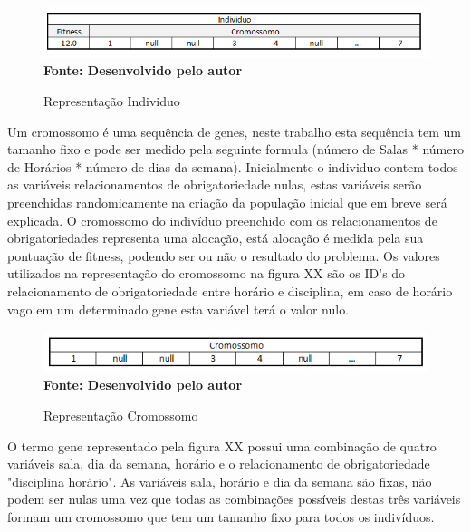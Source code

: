 \begin{figure}[!htb]
\caption[Representação Individuo]{Representação Individuo}
\label{fig:figura7}
\centering
\includegraphics[scale=0.8]{imagens/representacaoIndividuo.png}
\\ \textbf{\footnotesize Fonte: Desenvolvido pelo autor}
\end{figure}

Um cromossomo é uma sequência de genes, neste trabalho esta sequência tem um tamanho fixo e pode ser medido pela seguinte formula (número de Salas * número de Horários * número de dias da semana). Inicialmente o individuo contem todos as variáveis relacionamentos de obrigatoriedade nulas, estas variáveis serão preenchidas randomicamente na criação da população inicial que em breve será explicada. O cromossomo do indivíduo preenchido com os relacionamentos de obrigatoriedades representa uma alocação, está alocação é medida pela sua pontuação de fitness, podendo ser ou não o resultado do problema. Os valores utilizados na representação do cromossomo na figura XX são os ID's do relacionamento de obrigatoriedade entre horário e disciplina, em caso de horário vago em um determinado gene esta variável terá o valor nulo.\par

\begin{figure}[!htb]
\caption[Representação Cromossomo]{Representação Cromossomo}
\label{fig:figura6}
\centering
\includegraphics[scale=0.9]{imagens/representacaoCromossomo.png}
\\ \textbf{\footnotesize Fonte: Desenvolvido pelo autor}
\end{figure}

O termo gene representado pela figura XX possui uma combinação de quatro variáveis sala, dia da semana, horário e o relacionamento de obrigatoriedade 
"disciplina horário". As variáveis sala, horário e dia da semana são fixas, não podem ser nulas uma vez que todas as combinações possíveis destas três variáveis formam um cromossomo que tem um tamanho fixo para todos os indivíduos. \par


